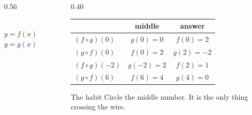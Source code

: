 \documentclass[aspectratio=169, 11pt]{beamer}
\newcommand{\lgrid}[4]{%
  \draw[step=1, linegray!45, thin] (#1,#3) grid (#2,#4);
  \draw[->, thick, charcoal] (#1,0)--(#2,0) node[below right, font=\tiny]{$x$};
  \draw[->, thick, charcoal] (0,#3)--(0,#4) node[left, font=\tiny]{$y$};}
\begin{document}
\begin{frame}[t, plain]
  \begin{columns}[T]
    \begin{column}{0.56\textwidth}
      \centering
      \hspace{2pt}
      \\[2pt]
      {\scriptsize \textcolor{forest}{$y=f(x)$} \hspace{2.2cm} \textcolor{navy}{$y=g(x)$}}
    \end{column}
    \begin{column}{0.40\textwidth}
      \footnotesize
      \begin{center}
      \renewcommand{\arraystretch}{1.35}
      \begin{tabular}{|l|c|c|}
      \hline
      & \textbf{middle} & \textbf{answer} \\ \hline
      $(f\circ g)(0)$ & $g(0)=0$ & $f(0)=2$ \\ \hline
      $(g\circ f)(0)$ & $f(0)=2$ & $g(2)=-2$ \\ \hline
      $(f\circ g)(-2)$ & $g(-2)=2$ & $f(2)=1$ \\ \hline
      $(g\circ f)(6)$ & $f(6)=4$ & $g(4)=0$ \\ \hline
      \end{tabular}
      \end{center}
      \vspace{4pt}
      \begin{block}{The habit}
        Circle the middle number. It is the only thing crossing the wire.
      \end{block}
    \end{column}
  \end{columns}
\end{frame}
\end{document}
